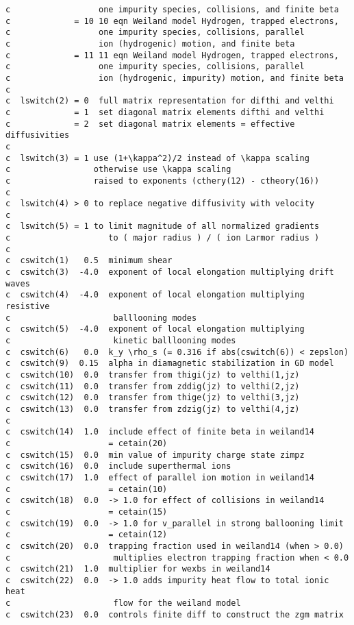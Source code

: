 \begin{verbatim}
c                  one impurity species, collisions, and finite beta
c             = 10 10 eqn Weiland model Hydrogen, trapped electrons,
c                  one impurity species, collisions, parallel
c                  ion (hydrogenic) motion, and finite beta
c             = 11 11 eqn Weiland model Hydrogen, trapped electrons,
c                  one impurity species, collisions, parallel
c                  ion (hydrogenic, impurity) motion, and finite beta
c
c  lswitch(2) = 0  full matrix representation for difthi and velthi
c             = 1  set diagonal matrix elements difthi and velthi
c             = 2  set diagonal matrix elements = effective diffusivities
c
c  lswitch(3) = 1 use (1+\kappa^2)/2 instead of \kappa scaling
c                 otherwise use \kappa scaling
c                 raised to exponents (cthery(12) - ctheory(16))
c
c  lswitch(4) > 0 to replace negative diffusivity with velocity
c
c  lswitch(5) = 1 to limit magnitude of all normalized gradients
c                    to ( major radius ) / ( ion Larmor radius )
c
c  cswitch(1)   0.5  minimum shear
c  cswitch(3)  -4.0  exponent of local elongation multiplying drift waves
c  cswitch(4)  -4.0  exponent of local elongation multiplying resistive
c                     balllooning modes
c  cswitch(5)  -4.0  exponent of local elongation multiplying
c                     kinetic balllooning modes
c  cswitch(6)   0.0  k_y \rho_s (= 0.316 if abs(cswitch(6)) < zepslon)
c  cswitch(9)  0.15  alpha in diamagnetic stabilization in GD model
c  cswitch(10)  0.0  transfer from thigi(jz) to velthi(1,jz)
c  cswitch(11)  0.0  transfer from zddig(jz) to velthi(2,jz)
c  cswitch(12)  0.0  transfer from thige(jz) to velthi(3,jz)
c  cswitch(13)  0.0  transfer from zdzig(jz) to velthi(4,jz)
c
c  cswitch(14)  1.0  include effect of finite beta in weiland14 
c                    = cetain(20)
c  cswitch(15)  0.0  min value of impurity charge state zimpz
c  cswitch(16)  0.0  include superthermal ions
c  cswitch(17)  1.0  effect of parallel ion motion in weiland14 
c                    = cetain(10)
c  cswitch(18)  0.0  -> 1.0 for effect of collisions in weiland14 
c                    = cetain(15)
c  cswitch(19)  0.0  -> 1.0 for v_parallel in strong ballooning limit 
c                    = cetain(12)
c  cswitch(20)  0.0  trapping fraction used in weiland14 (when > 0.0)
c                     multiplies electron trapping fraction when < 0.0
c  cswitch(21)  1.0  multiplier for wexbs in weiland14
c  cswitch(22)  0.0  -> 1.0 adds impurity heat flow to total ionic heat 
c                     flow for the weiland model
c  cswitch(23)  0.0  controls finite diff to construct the zgm matrix 

\end{verbatim}
